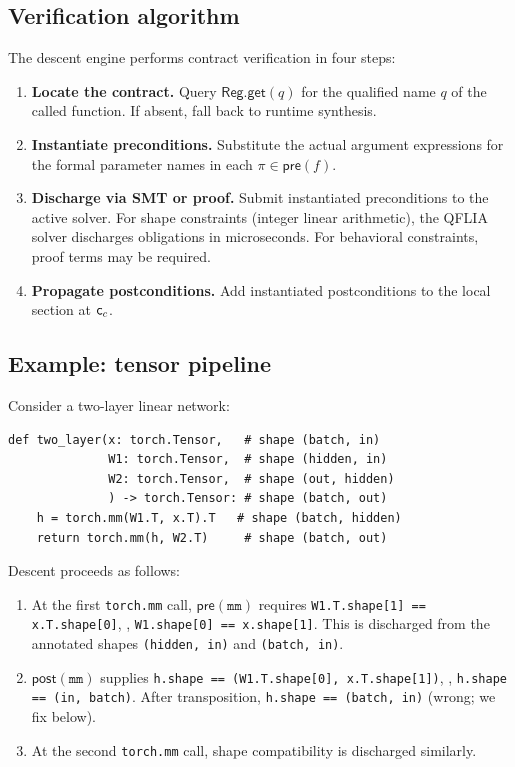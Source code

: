 \documentclass[11pt]{article}
\newcommand{\Pre}{\mathsf{pre}}            %
\newcommand{\Post}{\mathsf{post}}          %
\newcommand{\Reg}{\mathsf{Reg}}            %
\begin{document}
\subsection{Verification algorithm}

The \JuGeo{} descent engine performs contract verification in four steps:

\begin{enumerate}[label=\textbf{Step~\arabic*.}]
  \item \textbf{Locate the contract.}  Query
    $\Reg.\mathsf{get}(q)$ for the qualified name $q$ of the called
    function.  If absent, fall back to runtime synthesis.
  \item \textbf{Instantiate preconditions.}  Substitute the actual
    argument expressions for the formal parameter names in each
    $\pi \in \Pre(f)$.
  \item \textbf{Discharge via SMT or proof.}  Submit instantiated
    preconditions to the active solver.  For shape constraints
    (integer linear arithmetic), the QFLIA solver discharges
    obligations in microseconds.  For behavioral constraints,
    \LEAN{} proof terms may be required.
  \item \textbf{Propagate postconditions.}  Add instantiated
    postconditions to the local section at $\mathsf{c}_c$.
\end{enumerate}

\subsection{Example: tensor pipeline}

Consider a two-layer linear network:

\begin{lstlisting}[style=jugeo-python,
  caption={Two-layer linear network verified via descent.}]
def two_layer(x: torch.Tensor,   # shape (batch, in)
              W1: torch.Tensor,  # shape (hidden, in)
              W2: torch.Tensor,  # shape (out, hidden)
              ) -> torch.Tensor: # shape (batch, out)
    h = torch.mm(W1.T, x.T).T   # shape (batch, hidden)
    return torch.mm(h, W2.T)     # shape (batch, out)
\end{lstlisting}

Descent proceeds as follows:
\begin{enumerate}[label=(\arabic*)]
  \item At the first \texttt{torch.mm} call, $\Pre(\texttt{mm})$
    requires \texttt{W1.T.shape[1] == x.T.shape[0]}, \ie,
    \texttt{W1.shape[0] == x.shape[1]}.  This is discharged from the
    annotated shapes \texttt{(hidden, in)} and \texttt{(batch, in)}.
  \item $\Post(\texttt{mm})$ supplies
    \texttt{h.shape == (W1.T.shape[0], x.T.shape[1])},
    \ie, \texttt{h.shape == (in, batch)}.  After transposition,
    \texttt{h.shape == (batch, in)} (wrong; we fix below).
  \item At the second \texttt{torch.mm} call, shape compatibility is
    discharged similarly.
\end{enumerate}
\end{document}
